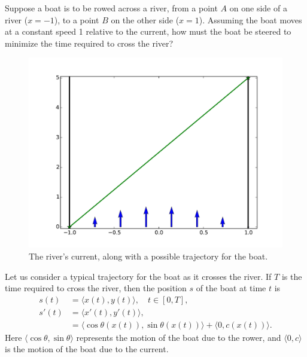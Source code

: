 \label{lab:rivercrossing}

Suppose a boat is to be rowed across a river, from a point $A$ on one side of a river ($x=-1$), to a point $B$ on the other side ($x=1$). 
Assuming the boat moves at a constant speed 1 relative to the current, how must the boat be steered to minimize the time required to cross the river? 

\begin{figure}
\centering
\includegraphics[width=\textwidth]{rivercurrent.pdf}
\caption{The river's current, along with a possible trajectory for the boat.}
\label{fig:rivercrossing_current}
\end{figure}

Let us consider a typical trajectory for the boat as it crosses the river. 
If $T$ is the time required to cross the river, then the position $s$ of the boat at time $t$ is
\begin{align*}
	s(t) &= \langle x(t), y(t) \rangle, \quad t \in [0,T], \\
	s'(t) &= \langle x'(t), y'(t) \rangle, \\
	&= \langle \cos \theta(x(t)),\sin \theta(x(t)) \rangle + \langle 0, c(x(t)) \rangle.
\end{align*}
Here $\langle \cos \theta, \sin \theta \rangle$ represents the motion of the boat due to the rower, and $\langle 0, c \rangle$ is the motion of the boat due to the current.

